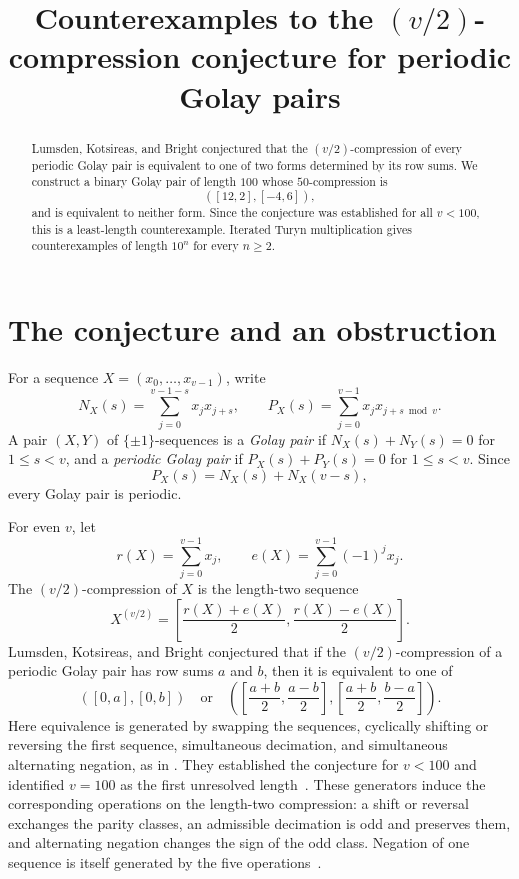 \documentclass[11pt]{amsart}
\title[Counterexamples to a compression conjecture]
{Counterexamples to the $(v/2)$-compression conjecture for periodic Golay pairs}
\date{}
\begin{document}
\begin{abstract}
Lumsden, Kotsireas, and Bright conjectured that the $(v/2)$-compression
of every periodic Golay pair is equivalent to one of two forms determined
by its row sums. We construct a binary Golay pair of length $100$ whose
$50$-compression is
\[
([12,2],[-4,6]),
\]
and is equivalent to neither form. Since the conjecture was established
for all $v<100$, this is a least-length counterexample. Iterated Turyn
multiplication gives counterexamples of length $10^n$ for every $n\ge2$.
\end{abstract}

\maketitle

\section{The conjecture and an obstruction}

For a sequence $X=(x_0,\ldots,x_{v-1})$, write
\[
N_X(s)=\sum_{j=0}^{v-1-s}x_jx_{j+s},
\qquad
P_X(s)=\sum_{j=0}^{v-1}x_jx_{j+s\bmod v}.
\]
A pair $(X,Y)$ of $\{\pm1\}$-sequences is a \emph{Golay pair} if
$N_X(s)+N_Y(s)=0$ for $1\le s<v$, and a \emph{periodic Golay pair}
if $P_X(s)+P_Y(s)=0$ for $1\le s<v$. Since
\[
P_X(s)=N_X(s)+N_X(v-s),
\]
every Golay pair is periodic.

For even $v$, let
\[
r(X)=\sum_{j=0}^{v-1}x_j,
\qquad
e(X)=\sum_{j=0}^{v-1}(-1)^jx_j.
\]
The $(v/2)$-compression of $X$ is the length-two sequence
\[
X^{(v/2)}
=
\left[
\frac{r(X)+e(X)}2,
\frac{r(X)-e(X)}2
\right].
\]
Lumsden, Kotsireas, and Bright conjectured that if the
$(v/2)$-compression of a periodic Golay pair has row sums $a$ and $b$,
then it is equivalent to one of
\begin{equation}\label{eq:forms}
([0,a],[0,b])
\quad\text{or}\quad
\left(
\left[\frac{a+b}{2},\frac{a-b}{2}\right],
\left[\frac{a+b}{2},\frac{b-a}{2}\right]
\right).
\end{equation}
Here equivalence is generated by swapping the sequences, cyclically
shifting or reversing the first sequence, simultaneous decimation, and
simultaneous alternating negation, as in
\cite[\S2.1 and Conjecture~1]{LKB}.
They established the conjecture for $v<100$ and identified $v=100$ as
the first unresolved length~\cite[\S7]{LKB}. These generators induce
the corresponding operations on the length-two compression: a shift or
reversal exchanges the parity classes, an admissible decimation is odd
and preserves them, and alternating negation changes the sign of the
odd class. Negation of one sequence is itself generated by the five
operations~\cite[\S2.1]{LKB}.
\end{document}
